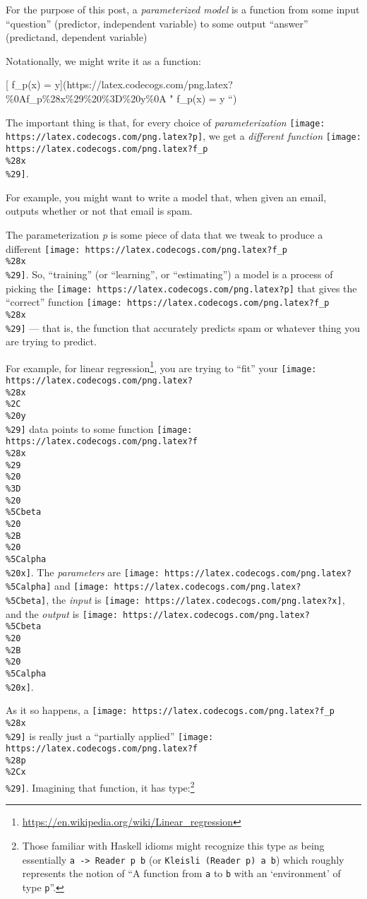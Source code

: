 \documentclass[]{article}
\renewcommand{\href}[2]{#2\footnote{\url{#1}}}
\begin{document}
For the purpose of this post, a \emph{parameterized model} is a function from
some input ``question'' (predictor, independent variable) to some output
``answer'' (predictand, dependent variable)

Notationally, we might write it as a function:

{[} f\_p(x) =
y{]}(https://latex.codecogs.com/png.latex?\%0Af\_p\%28x\%29\%20\%3D\%20y\%0A "
f\_p(x) = y ``)

The important thing is that, for every choice of \emph{parameterization}
\texttt{[image: https://latex.codecogs.com/png.latex?p]}, we get a
\emph{different function}
\texttt{[image: https://latex.codecogs.com/png.latex?f\_p\\\%28x\\\%29]}.

For example, you might want to write a model that, when given an email, outputs
whether or not that email is spam.

The parameterization \emph{p} is some piece of data that we tweak to produce a
different \texttt{[image: https://latex.codecogs.com/png.latex?f\_p\\\%28x\\\%29]}.
So, ``training'' (or ``learning'', or ``estimating'') a model is a process of
picking the \texttt{[image: https://latex.codecogs.com/png.latex?p]} that gives
the ``correct'' function
\texttt{[image: https://latex.codecogs.com/png.latex?f\_p\\\%28x\\\%29]} --- that is,
the function that accurately predicts spam or whatever thing you are trying to
predict.

For example, for \href{https://en.wikipedia.org/wiki/Linear_regression}{linear
regression}, you are trying to ``fit'' your
\texttt{[image: https://latex.codecogs.com/png.latex?\\\%28x\\\%2C\\\%20y\\\%29]} data
points to some function
\texttt{[image: https://latex.codecogs.com/png.latex?f\\\%28x\\\%29\\\%20\\\%3D\\\%20\\\%5Cbeta\\\%20\\\%2B\\\%20\\\%5Calpha\\\%20x]}.
The \emph{parameters} are
\texttt{[image: https://latex.codecogs.com/png.latex?\\\%5Calpha]} and
\texttt{[image: https://latex.codecogs.com/png.latex?\\\%5Cbeta]}, the
\emph{input} is \texttt{[image: https://latex.codecogs.com/png.latex?x]}, and
the \emph{output} is
\texttt{[image: https://latex.codecogs.com/png.latex?\\\%5Cbeta\\\%20\\\%2B\\\%20\\\%5Calpha\\\%20x]}.

As it so happens, a
\texttt{[image: https://latex.codecogs.com/png.latex?f\_p\\\%28x\\\%29]} is really
just a ``partially applied''
\texttt{[image: https://latex.codecogs.com/png.latex?f\\\%28p\\\%2Cx\\\%29]}.
Imagining that function, it has type:\footnote{Those familiar with Haskell
  idioms might recognize this type as being essentially
  \texttt{a\ -\textgreater{}\ Reader\ p\ b} (or
  \texttt{Kleisli\ (Reader\ p)\ a\ b}) which roughly represents the notion of
  ``A function from \texttt{a} to \texttt{b} with an `environment' of type
  \texttt{p}''.}
\end{document}
